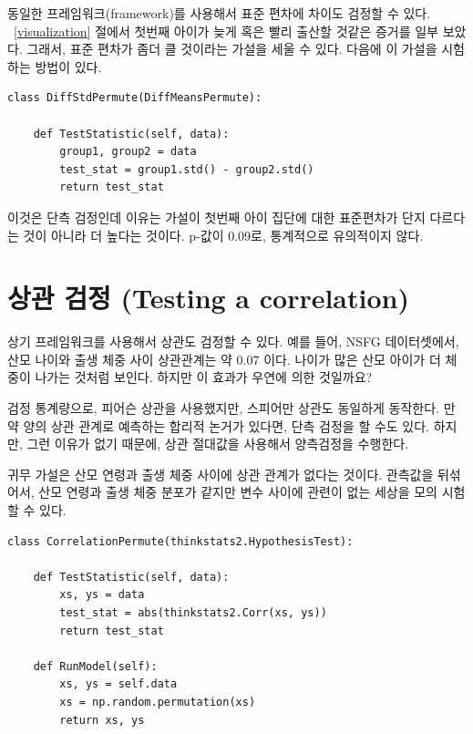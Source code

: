 동일한 프레임워크(framework)를 사용해서 표준 편차에 차이도 검정할 수 있다. 
~\ref{visualization} 절에서 첫번째 아이가 늦게 혹은 빨리 출산할 것같은 증거를 일부 보았다. 그래서, 표준 편차가 좀더 클 것이라는 가설을 세울 수 있다. 다음에 이 가설을 시험하는 방법이 있다.


\begin{verbatim}
class DiffStdPermute(DiffMeansPermute):

    def TestStatistic(self, data):
        group1, group2 = data
        test_stat = group1.std() - group2.std()
        return test_stat
\end{verbatim}

이것은 단측 검정인데 이유는 가설이 첫번째 아이 집단에 대한 표준편차가 단지 다르다는 것이 아니라 더 높다는 것이다. p-값이 0.09로, 통계적으로 유의적이지 않다.



\section{상관 검정 (Testing a correlation)}
\label{corrtest}

상기 프레임워크를 사용해서 상관도 검정할 수 있다. 
예를 들어, NSFG 데이터셋에서, 산모 나이와 출생 체중 사이 상관관계는 약 0.07 이다. 
나이가 많은 산모 아이가 더 체중이 나가는 것처럼 보인다. 하지만 이 효과가 우연에 의한 것일까요?

검정 통계량으로, 피어슨 상관을 사용했지만, 스피어만 상관도 동일하게 동작한다. 만약 양의 상관 관계로 예측하는 합리적 논거가 있다면, 단측 검정을 할 수도 있다. 하지만, 그런 이유가 없기 때문에, 상관 절대값을 사용해서 양측검정을 수행한다.

귀무 가설은 산모 연령과 출생 체중 사이에 상관 관계가 없다는 것이다.
관측값을 뒤섞어서, 산모 연령과 출생 체중 분포가 같지만 변수 사이에 관련이 없는 세상을 모의 시험할 수 있다.

\begin{verbatim}
class CorrelationPermute(thinkstats2.HypothesisTest):

    def TestStatistic(self, data):
        xs, ys = data
        test_stat = abs(thinkstats2.Corr(xs, ys))
        return test_stat

    def RunModel(self):
        xs, ys = self.data
        xs = np.random.permutation(xs)
        return xs, ys
\end{verbatim}

